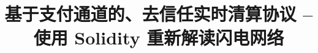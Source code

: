 \documentclass[lang=cn,headings=optiontohead]{elegantpaper}
\title{基于支付通道的、去信任实时清算协议 \linebreak -- 使用 Solidity 重新解读闪电网络}
\institute{OK区块链工程院}
\begin{document}
\maketitle



\newpage

\tableofcontents

\lstlistoflistings

\newpage










\pagebreak



\pagebreak


\pagebreak
\end{document}
